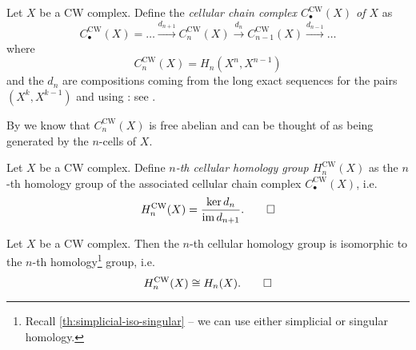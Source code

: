 \documentclass[12pt]{article}
\numberwithin{equation}{subsection}
\numberwithin{theorem}{subsection}
\numberwithin{lemma}{subsection}
\numberwithin{corollary}{subsection}
\numberwithin{definition}{subsection}
\numberwithin{example}{subsection}
\numberwithin{note}{subsection}
\DeclareMathOperator{\im}{im}
\begin{document}
\begin{appendices}
            \begin{definition}
                Let $X$ be a CW complex.
                Define the \emph{cellular chain complex $C_\bullet^{\text{CW}}(X)$ of $X$} as
                \begin{equation*}
                    C_\bullet^{\text{CW}}(X) = \ldots \xrightarrow{d_{n+1}} C_n^{\text{CW}}(X) \xrightarrow{d_n} C_{n-1}^{\text{CW}}(X) \xrightarrow{d_{n-1}} \ldots
                \end{equation*}
                where
                \begin{equation*}
                    C_n^\text{CW}(X) = H_n(X^n,X^{n-1})
                \end{equation*}
                and the $d_n$ are compositions coming from the long exact sequences for the pairs $(X^k,X^{k-1})$ and using \cite[Lemma~2.34,~\S2.2]{hatcher2002algebraic}: see \cite[\S2.2,~p.~139]{hatcher2002algebraic}.
            \end{definition}

            By \cite[Lemma~2.34,~\S2.2]{hatcher2002algebraic} we know that $C_n^\text{CW}(X)$ is free abelian and can be thought of as being generated by the $n$-cells of $X$.

            \begin{definition}
                Let $X$ be a CW complex.
                Define \emph{$n$-th cellular homology group $H_n^\text{CW}(X)$} as the $n$-th homology group of the associated cellular chain complex $C_\bullet^{\text{CW}}(X)$, i.e.
                \begin{equation*}
                    H_n^\text{CW}(X) = \frac{\ker d_n}{\im d_{n+1}}.\qedhere
                \end{equation*}
            \end{definition}

            \begin{theorem}\label{th:cellular-iso-sing-or-simp}
                Let $X$ be a CW complex.
                Then the $n$-th cellular homology group is isomorphic to the $n$-th homology\footnote{
                    Recall \cref{th:simplicial-iso-singular} -- we can use either simplicial or singular homology.
                } group, i.e.
                \begin{equation*}
                    H_n^\text{CW}(X)\cong H_n(X).\qedhere
                \end{equation*}
            \end{theorem}


\end{appendices}
\end{document}

